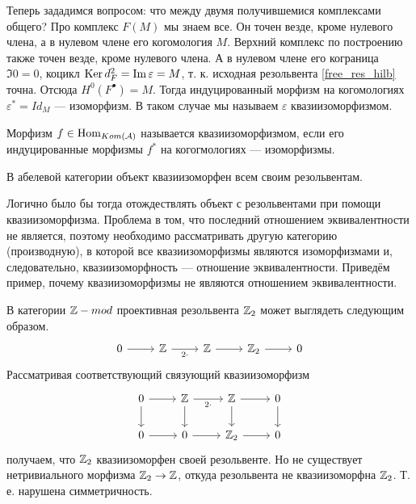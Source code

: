 \documentclass[../main.tex]{subfiles}
\begin{document}
Теперь зададимся вопросом: что между двумя получившемися комплексами общего? Про комплекс $F(M)$ мы знаем все. Он точен везде, кроме нулевого члена, а в нулевом члене его когомология $M$. Верхний комплекс по построению также точен везде, кроме нулевого члена. А в нулевом члене его кограница $\Im 0 = 0$, коцикл $\mathop{\mathrm{Ker}}\nolimits d^2_F = \mathop{\mathrm{Im}}\nolimits \varepsilon = M$, т. к. исходная резольвента \eqref{free_res_hilb} точна. Отсюда $H^0(F^\bullet) = M$. Тогда индуцированный морфизм на когомологиях $\varepsilon^* = Id_M$ --- изоморфизм. В таком случае мы называем $\varepsilon$ квазиизоморфизмом.
\begin{to_def}
Морфизм $f\in \operatorname{Hom}_{Kom(\mathcal{A})}$ называется квазиизоморфизмом, если его индуцированные морфизмы $f^*$ на когогмологиях --- изоморфизмы.
\end{to_def}
\begin{to_suj}\label{obj_res_eq}
В абелевой категории объект квазиизоморфен всем своим резольвентам.
\end{to_suj}
Логично было бы тогда отождествлять объект с резольвентами при помощи квазиизоморфизма. Проблема в том, что последний отношением эквивалентности не является, поэтому необходимо рассматривать другую категорию (производную), в которой все квазиизоморфизмы являются изоморфизмами и, следовательно, квазиизоморфность --- отношение эквивалентности.
Приведём пример, почему квазиизоморфизмы не являются отношением эквивалентности.
\begin{to_ex}
В категории $\mathbb{Z}-mod$ проективная резольвента $\mathbb{Z}_2$ может выглядеть следующим образом.
\begin{equation*}
    \begin{tikzcd}
	0 & \Z & \Z & {\Z_2} & 0
	\arrow[from=1-1, to=1-2]
	\arrow["2\cdot"', from=1-2, to=1-3]
	\arrow[from=1-3, to=1-4]
	\arrow[from=1-4, to=1-5]
\end{tikzcd}
\end{equation*}
Рассматривая соответствующий связующий квазиизоморфизм
\begin{equation*}
    \begin{tikzcd}
	0 & \Z & \Z & 0 \\
	0 & 0 & {\Z_2} & 0
	\arrow[from=1-1, to=1-2]
	\arrow["2\cdot"', from=1-2, to=1-3]
	\arrow[from=1-3, to=1-4]
	\arrow[from=1-3, to=2-3]
	\arrow[from=1-4, to=2-4]
	\arrow[from=1-2, to=2-2]
	\arrow[from=1-1, to=2-1]
	\arrow[from=2-1, to=2-2]
	\arrow[from=2-2, to=2-3]
	\arrow[from=2-3, to=2-4]
\end{tikzcd}
\end{equation*}
получаем, что $\mathbb{Z}_2$ квазиизоморфен своей резольвенте. Но не существует нетривиального морфизма $\mathbb{Z}_2\to \mathbb{Z}$, откуда резольвента не квазиизоморфна $\mathbb{Z}_2$. Т. е. нарушена симметричность.
\end{to_ex}
\end{document}
